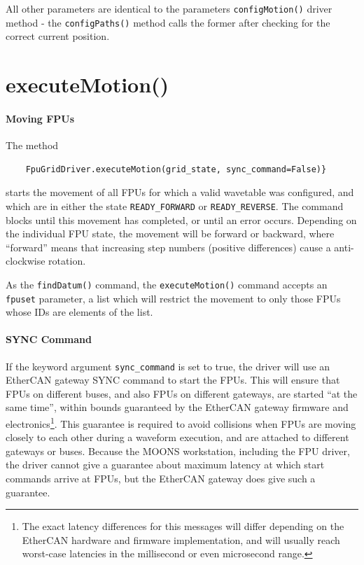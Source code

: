 \documentclass[fontsize=12,a4paper]{scrreprt}
\begin{document}
All other parameters are identical to the parameters
\texttt{configMotion()} driver method - the \texttt{configPaths()}
method calls the former after checking for the correct current
position.


\section{executeMotion()}

\paragraph{Moving FPUs}

\begin{sloppypar}
  The method
  \begin{verbatim}
    FpuGridDriver.executeMotion(grid_state, sync_command=False)}
  \end{verbatim}
  starts the movement of all FPUs for which a valid wavetable was
  configured, and which are in either the state
  \texttt{READY\_FORWARD} or \texttt{READY\_REVERSE}. The command
  blocks until this movement has completed, or until an error
  occurs. Depending on the individual FPU state, the movement will be
  forward or backward, where ``forward'' means that increasing step
  numbers (positive differences) cause a anti-clockwise rotation.
\end{sloppypar}

As the \texttt{findDatum()} command, the \texttt{executeMotion()}
command accepts an \texttt{fpuset} parameter, a list which will
restrict the movement to only those FPUs whose IDs are elements of the
list.

\paragraph{SYNC Command}
\label{sec:synccommand}
%
%
%
%
%
%

If the keyword argument \texttt{sync\_command} is set to true, the
driver will use an EtherCAN gateway SYNC command to start the
FPUs. This will ensure that FPUs on different buses, and also FPUs on
different gateways, are started ``at the same time'', within bounds
guaranteed by the EtherCAN gateway firmware and
electronics\footnote{The exact latency differences for this messages
  will differ depending on the EtherCAN hardware and firmware
  implementation, and will usually reach worst-case latencies in the
  millisecond or even microsecond range.}. This guarantee is required
to avoid collisions when FPUs are moving closely to each other during
a waveform execution, and are attached to different gateways or
buses. Because the MOONS workstation, including the FPU driver, the
driver cannot give a guarantee about maximum latency at which start
commands arrive at FPUs, but the EtherCAN gateway does give such a
guarantee.
\end{document}
